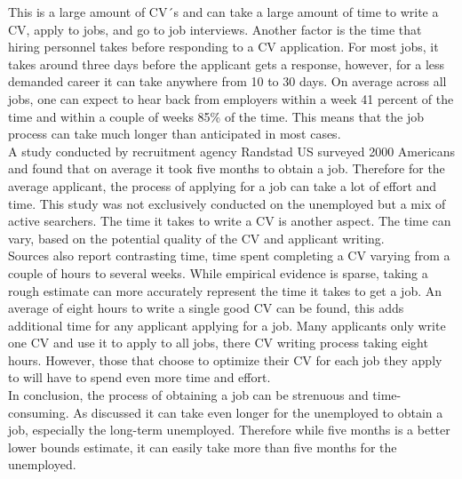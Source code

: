 This is a large amount of CV´s and can take a large amount of time to write a CV, apply to jobs, and go to job interviews.
Another factor is the time that hiring personnel takes before responding to a CV application.
For most jobs, it takes around three days before the applicant gets a response, however, for a less demanded career it can take anywhere from 10 to 30 days.\cite{HR-sales}
On average across all jobs, one can expect to hear back from employers within a week 41 percent of the time and within a couple of weeks 85\% of the time.
This means that the job process can take much longer than anticipated in most cases. \\

A study conducted by recruitment agency Randstad US surveyed 2000 Americans and found that on average it took five months to obtain a job.\cite{5_month_for_a_job}
Therefore for the average applicant, the process of applying for a job can take a lot of effort and time.
This study was not exclusively conducted on the unemployed but a mix of active searchers.
The time it takes to write a CV is another aspect.
The time can vary, based on the potential quality of the CV and applicant writing. \\
 
Sources also report contrasting time, time spent completing a CV varying from a couple of hours to several weeks.
While empirical evidence is sparse, taking a rough estimate can more accurately represent the time it takes to get a job.
An average of eight hours to write a single good CV can be found, this adds additional time for any applicant applying for a job.
Many applicants only write one CV and use it to apply to all jobs, there CV writing process taking eight hours.\cite{CV_Using_One}
However, those that choose to optimize their CV for each job they apply to will have to spend even more time and effort. \\

In conclusion, the process of obtaining a job can be strenuous and time-consuming.\cite{Time_spent_writing_CV}
As discussed it can take even longer for the unemployed to obtain a job, especially the long-term unemployed.
Therefore while five months is a better lower bounds estimate, it can easily take more than five months for the unemployed. \\

